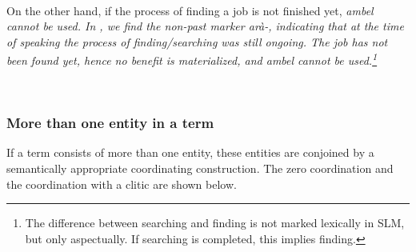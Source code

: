  \\
On the other hand, if the process of finding a job is not finished yet, \em ambel \em cannot be used. In , we find the non-past marker \em arà-\em, indicating that at the time of speaking the process of finding/searching was still ongoing. The job has not been found yet, hence no benefit is materialized, and \em ambel \em cannot be used.\footnote{The difference between searching and finding is not marked lexically in SLM, but only aspectually. If searching is completed, this implies finding.}

 \\



\subsubsection{More than one entity in a term}\label{sec:func:Morethanoneentityinaterm}
If a term consists of more than one entity, these entities are conjoined by a semantically appropriate coordinating construction. The zero coordination  and the coordination with a clitic  are shown below.

%



